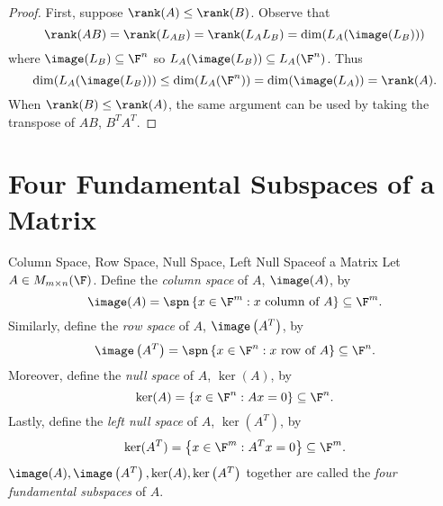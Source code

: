 \documentclass[linearalgebra]{subfiles}
\begin{document}
    \begin{proof}
        First, suppose $\rank (A)\leq \rank(B)$. Observe that
        \begin{equation*}
            \rank(AB) = \rank( L_{AB}) = \rank (L_AL_B) = \dim (L_A(\image(L_B)))
        \end{equation*}
        where $\image(L_B)\subseteq \F^n$ so $L_A(\image(L_B))\subseteq L_A(\F^n)$. Thus
        \begin{equation*}
            \dim (L_A(\image(L_B))) \leq \dim (L_A(\F^n)) = \dim (\image(L_A)) = \rank(A).
        \end{equation*}
        When $\rank(B)\leq \rank(A)$, the same argument can be used by taking the transpose of $AB$, $B^TA^T$.
    \end{proof}

    \section{Four Fundamental Subspaces of a Matrix}

    \begin{definition}{Column Space, Row Space, Null Space, Left Null Space}{of a Matrix}
        Let $A\in M_{m\times n}(\F)$. Define the \emph{column space} of $A$, $\image(A)$, by
            \begin{equation*}
                \image(A) = \spn \left\lbrace x\in \F^m: x\text{ column of }A \right\rbrace \subseteq\F^m.
            \end{equation*}
            Similarly, define the \emph{row space} of $A$, $\image\left( A^{T}  \right) $, by
            \begin{equation*}
                \image\left( A^{T}  \right)  = \spn \left\lbrace x\in \F^n: x\text{ row of }A \right\rbrace\subseteq\F^n.
            \end{equation*}
            Moreover, define the \emph{null space} of $A$, $\ker(A)$, by
            \begin{equation*}
                \ker(A) = \left\lbrace x\in \F^n: Ax = 0 \right\rbrace\subseteq\F^n.
            \end{equation*}
            Lastly, define the \emph{left null space} of $A$, $\ker\left( A^{T}  \right) $, by
            \begin{equation*}
                \ker (A^T) = \left\lbrace x\in \F^m: A^Tx = 0 \right\rbrace\subseteq\F^m.
            \end{equation*}
            $\image(A), \image\left( A^{T} \right) , \ker(A), \ker\left( A^{T}  \right)$ together are called the \emph{four fundamental subspaces} of $A$.
    \end{definition}
\end{document}

